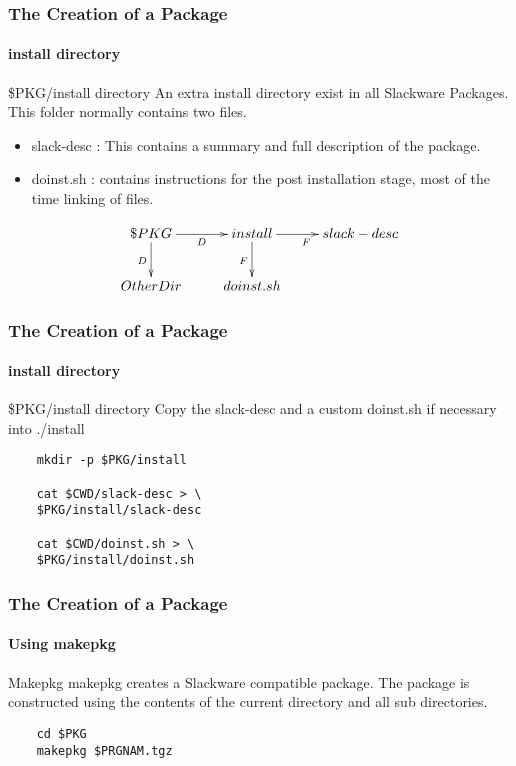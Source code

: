 \documentclass[12pt,hyperref={pdfpagelabels=true}]{beamer}
\begin{document}
\begin{frame}[fragile]
  \frametitle{The Creation of a Package}
  \framesubtitle{install directory}
  \begin{block}{\$PKG/install directory}
    An extra install directory exist in all Slackware Packages.
    This folder normally contains two files.
    \begin{itemize}[<+-| alert@+>]
    \item slack-desc : This contains a summary and full description of the
      package.
    \item doinst.sh : contains instructions for the post installation stage,
      most of the time linking of files.
    \end{itemize}
  \end{block}

  \pause
  
  \begin{equation*}
    \xymatrix@C=2pc@R=2pc{
      \$PKG\/\ar[r]_D\ar[d]_D & install\ar[r]_F\ar[d]_F & slack-desc\\
      OtherDir  & doinst.sh  }
  \end{equation*}
\end{frame}

\begin{frame}[fragile]
  \frametitle{The Creation of a Package}
  \framesubtitle{install directory}
  \begin{block}{\$PKG/install directory}
    Copy the slack-desc and a custom doinst.sh if necessary into ./install
  \end{block}
  
  \pause
  
  \begin{lstlisting}
    mkdir -p $PKG/install
    
    cat $CWD/slack-desc > \
    $PKG/install/slack-desc
    
    cat $CWD/doinst.sh > \
    $PKG/install/doinst.sh
  \end{lstlisting}
\end{frame}


\begin{frame}[fragile]
  \frametitle{The Creation of a Package}
  \framesubtitle{Using makepkg}
  \begin{block}{Makepkg}
    makepkg creates a Slackware compatible package. The package is constructed
    using the contents of the current directory and all sub directories.
  \end{block}
  
  \pause
  
  \begin{lstlisting}
    cd $PKG
    makepkg $PRGNAM.tgz
  \end{lstlisting}
\end{frame}
\end{document}
